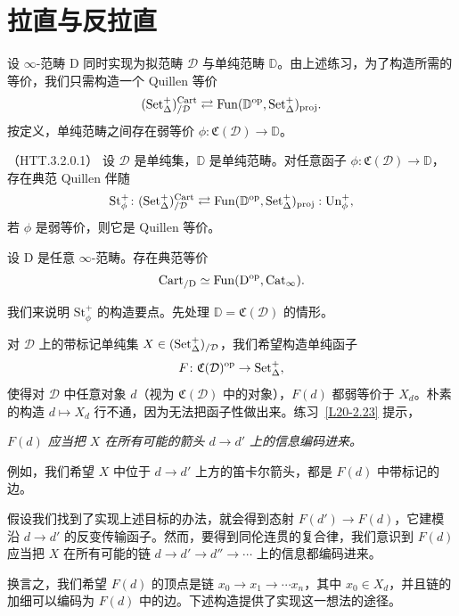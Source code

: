\section{拉直与反拉直}

\nitem\label{L20-3.1} 设 $\infty$-范畴 $\mathrm{D}$ 同时实现为拟范畴 $\mathcal{D}$ 与单纯范畴 $\mathbb{D}$。由上述练习，为了构造所需的等价，我们只需构造一个 Quillen 等价
\[
(\operatorname{Set}^+_\Delta)^{\mathrm{Cart}}_{/\mathcal{D}}\rightleftarrows\operatorname{Fun}(\mathbb{D}^{\mathrm{op}},\operatorname{Set}^+_\Delta)_{\mathrm{proj}}.
\]
按定义，单纯范畴之间存在弱等价 $\phi\colon\mathfrak{C}(\mathcal{D})\to\mathbb{D}$。

\begin{theorem}\label{L20-3.2}（HTT.3.2.0.1）
设 $\mathcal{D}$ 是单纯集，$\mathbb{D}$ 是单纯范畴。对任意函子 $\phi\colon\mathfrak{C}(\mathcal{D})\to\mathbb{D}$，存在典范 Quillen 伴随
\[
\mathrm{St}^+_{\phi}\colon(\operatorname{Set}^+_\Delta)^{\mathrm{Cart}}_{/\mathcal{D}}\rightleftarrows\operatorname{Fun}(\mathbb{D}^{\mathrm{op}},\operatorname{Set}^+_\Delta)_{\mathrm{proj}}:\mathrm{Un}^+_{\phi},
\]
若 $\phi$ 是弱等价，则它是 Quillen 等价。
\end{theorem}

\begin{corollary}\label{L20-3.3}
设 $\mathrm{D}$ 是任意 $\infty$-范畴。存在典范等价
\[
\mathrm{Cart}_{/\mathrm{D}}\simeq\operatorname{Fun}(\mathrm{D}^{\mathrm{op}},\operatorname{Cat}_\infty).
\]
\end{corollary}

\nitem\label{L20-3.4} 我们来说明 $\mathrm{St}^+_{\phi}$ 的构造要点。先处理 $\mathbb{D}=\mathfrak{C}(\mathcal{D})$ 的情形。

对 $\mathcal{D}$ 上的带标记单纯集 $X\in(\operatorname{Set}^+_\Delta)_{/\mathcal{D}}$，我们希望构造单纯函子
\[
F\colon\mathfrak{C}(\mathcal{D})^{\mathrm{op}}\to\operatorname{Set}^+_\Delta,
\]
使得对 $\mathcal{D}$ 中任意对象 $d$（视为 $\mathfrak{C}(\mathcal{D})$ 中的对象），$F(d)$ 都弱等价于 $X_d$。朴素的构造 $d\mapsto X_d$ 行不通，因为无法把函子性做出来。练习~\ref{L20-2.23} 提示，
\begin{center}
\emph{$F(d)$ 应当把 $X$ 在所有可能的箭头 $d\to d'$ 上的信息编码进来。}
\end{center}
例如，我们希望 $X$ 中位于 $d\to d'$ 上方的笛卡尔箭头，都是 $F(d)$ 中带标记的边。

假设我们找到了实现上述目标的办法，就会得到态射 $F(d')\to F(d)$，它建模沿 $d\to d'$ 的反变传输函子。然而，要得到同伦连贯的复合律，我们意识到 $F(d)$ 应当把 $X$ 在所有可能的链 $d\to d'\to d''\to\cdots$ 上的信息都编码进来。

换言之，我们希望 $F(d)$ 的顶点是链 $x_0\to x_1\to\cdots x_n$，其中 $x_0\in X_d$，并且链的加细可以编码为 $F(d)$ 中的边。下述构造提供了实现这一想法的途径。

